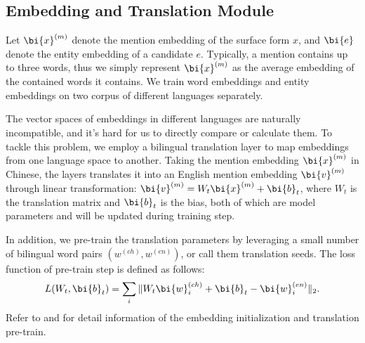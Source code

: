 \subsection{Embedding and Translation Module}
\label{sec:translation}

Let $\bi{x}^{(m)}$ denote the mention embedding of the surface form $x$,
and $\bi{e}$ denote the entity embedding of a candidate $e$.
Typically, a mention contains up to three words,
thus we simply represent $\bi{x}^{(m)}$ as the average embedding of the contained words it contains.
We train word embeddings and entity embeddings on two corpus of different languages separately.

The vector spaces of embeddings in different languages are naturally incompatible,
and it's hard for us to directly compare or calculate them.
To tackle this problem, we employ a bilingual translation layer
to map embeddings from one language space to another.
Taking the mention embedding $\bi{x}^{(m)}$ in Chinese,
the layers translates it into an English mention embedding $\bi{v}^{(m)}$ through linear transformation:
$\bi{v}^{(m)}=W_t \bi{x}^{(m)} + \bi{b}_t$, where $W_t$ is the translation matrix and $\bi{b}_t$ is the bias,
both of which are model parameters
and will be updated during training step.

In addition, we pre-train the translation parameters by leveraging a small number of
bilingual word pairs $(w^{(ch)}, w^{(en)})$, or call them translation seeds.
The loss function of pre-train step is defined as follows:
\begin{equation}
\label{eqn:translation}
L(W_{t}, \bi{b}_{t}) = \sum_i \Arrowvert W_{t} \bi{w}_i^{(ch)} + \bi{b}_{t} - \bi{w}_i^{(en)} \Arrowvert_2.
\end{equation}
Refer to  and 
for detail information of the embedding initialization and translation pre-train.


